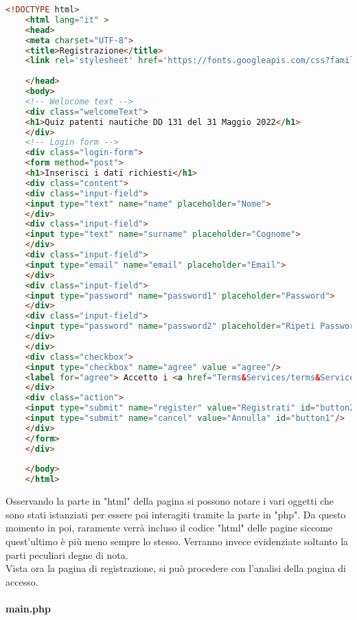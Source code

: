  \begin{lstlisting}[language=html]
 	<!DOCTYPE html>
 	<html lang="it" >
 	<head>
 	<meta charset="UTF-8">
 	<title>Registrazione</title>
 	<link rel='stylesheet' href='https://fonts.googleapis.com/css?family=Rubik:400,700'><link rel="stylesheet" href="style.css">
 	
 	</head>
 	<body>
 	<!-- Welocome text -->
 	<div class="welcomeText">
 	<h1>Quiz patenti nautiche DD 131 del 31 Maggio 2022</h1>
 	</div>
 	<!-- Login form -->
 	<div class="login-form">
 	<form method="post">
 	<h1>Inserisci i dati richiesti</h1>
 	<div class="content">
 	<div class="input-field">
 	<input type="text" name="name" placeholder="Nome">
 	</div>
 	<div class="input-field">
 	<input type="text" name="surname" placeholder="Cognome">
 	</div>
 	<div class="input-field">
 	<input type="email" name="email" placeholder="Email">
 	</div>
 	<div class="input-field">
 	<input type="password" name="password1" placeholder="Password">
 	</div>
 	<div class="input-field">
 	<input type="password" name="password2" placeholder="Ripeti Password">
 	</div>
 	</div>
 	<div class="checkbox">
 	<input type="checkbox" name="agree" value ="agree"/>
 	<label for="agree"> Accetto i <a href="Terms&Services/terms&Services.html">Termini</a> di utilizzo</label>
 	</div>
 	<div class="action">
 	<input type="submit" name="register" value="Registrati" id="button2"/>
 	<input type="submit" name="cancel" value="Annulla" id="button1"/>
 	</div>
 	</form>
 	</div>
 	
 	</body>
 	</html>
  \end{lstlisting}
  
  Osservando la parte in "html" della pagina si possono notare i vari oggetti che sono stati istanziati per essere poi interagiti tramite la parte in "php". Da questo momento in poi, raramente verrà incluso il codice "html" delle pagine siccome quest'ultimo è più meno sempre lo stesso. Verranno invece evidenziate soltanto la parti peculiari degne di nota.\\
  
  Vista ora la pagina di registrazione, si può procedere con l'analisi della pagina di accesso.\\
  
  \paragraph{main.php}\leavevmode\\
  
